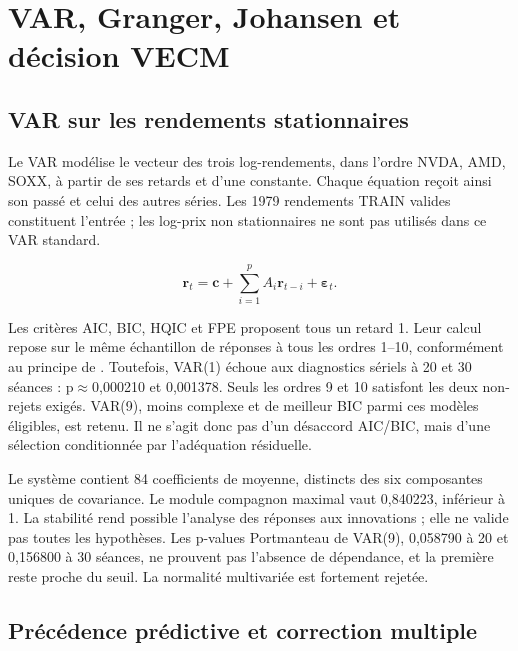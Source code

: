\section{VAR, Granger, Johansen et décision VECM}
\label{sec:var}

\subsection{VAR sur les rendements stationnaires}



Le VAR modélise le vecteur des trois log-rendements, dans l’ordre NVDA, AMD, SOXX, à partir de ses retards et d’une constante. Chaque équation reçoit ainsi son passé et celui des autres séries. Les 1979 rendements TRAIN valides constituent l’entrée ; les log-prix non stationnaires ne sont pas utilisés dans ce VAR standard.



\begin{equation}\label{eq:var} \boldsymbol r_t=\boldsymbol c+\sum_{i=1}^{p}A_i\boldsymbol r_{t-i}+\boldsymbol\varepsilon_t.\end{equation}



Les critères AIC, BIC, HQIC et FPE proposent tous un retard 1. Leur calcul repose sur le même échantillon de réponses à tous les ordres 1--10, conformément au principe de  \cite{R7}. Toutefois, VAR(1) échoue aux diagnostics sériels à 20 et 30 séances : p\(\approx\)0,000210 et 0,001378. Seuls les ordres 9 et 10 satisfont les deux non-rejets exigés. VAR(9), moins complexe et de meilleur BIC parmi ces modèles éligibles, est retenu. Il ne s’agit donc pas d’un désaccord AIC/BIC, mais d’une sélection conditionnée par l’adéquation résiduelle.



Le système contient 84 coefficients de moyenne, distincts des six composantes uniques de covariance. Le module compagnon maximal vaut 0,840223, inférieur à 1. La stabilité rend possible l’analyse des réponses aux innovations ; elle ne valide pas toutes les hypothèses. Les p-values Portmanteau de VAR(9), 0,058790 à 20 et 0,156800 à 30 séances, ne prouvent pas l’absence de dépendance, et la première reste proche du seuil. La normalité multivariée est fortement rejetée.



\subsection{Précédence prédictive et correction multiple}



